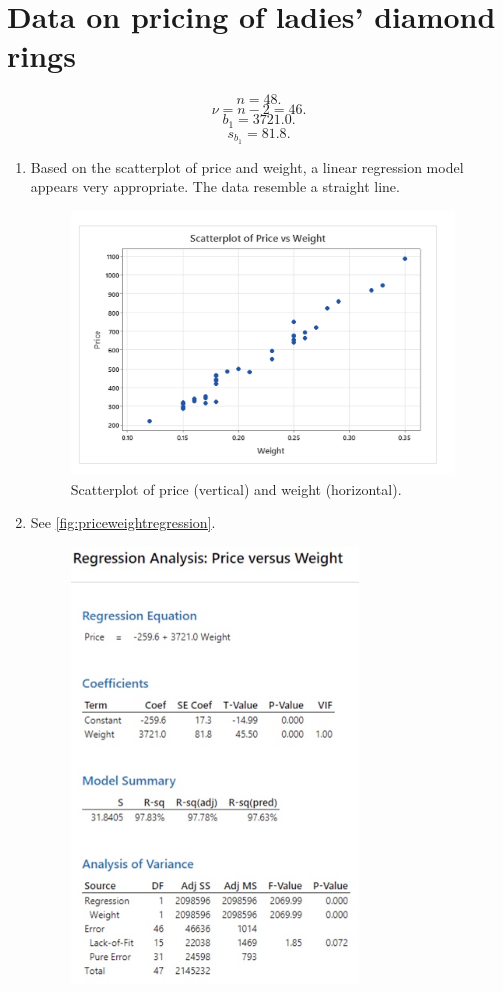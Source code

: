 \documentclass[12pt]{article}
\begin{document}
\section{Data on pricing of ladies' diamond rings}
\[n=48.\]
\[\nu=n-2=46.\]
\[b_1=3721.0.\]
\[s_{b_1}=81.8.\]
\begin{enumerate}
\item Based on the scatterplot of price and weight, a linear regression model appears very appropriate. The data resemble a straight line.
\begin{figure}[h]
\begin{center}
\includegraphics[width=4in]{images/price-weight-scatterplot.png}
\end{center}
\caption{Scatterplot of price (vertical) and weight (horizontal).}
\end{figure}
\item See \autoref{fig:priceweightregression}.
\begin{figure}
\begin{center}
\includegraphics[width=3in]{images/price-weight-regression.png}

\end{center}
\end{figure}
\end{enumerate}
\end{document}
